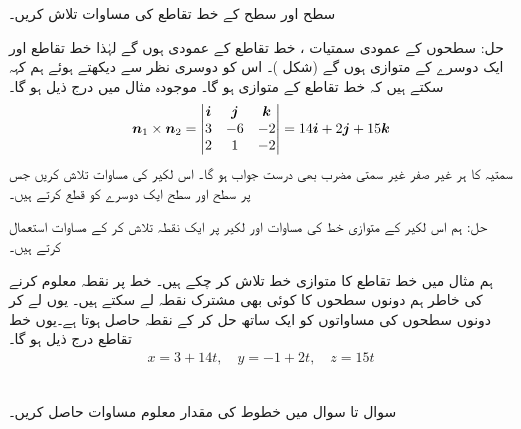 سطح  اور سطح  کے خط تقاطع کی مساوات تلاش کریں۔

حل:\quad
سطحوں کے عمودی سمتیات ،      خط تقاطع کے  عمودی ہوں  گے  لہٰذا خط تقاطع اور   ایک دوسرے کے  متوازی ہوں  گے (شکل )۔ اس کو دوسری نظر سے دیکھتے ہوئے ہم کہہ سکتے ہیں کہ   خط تقاطع کے متوازی ہو گا۔ موجودہ مثال میں درج ذیل ہو گا۔
\begin{align*}
{\ensuremath{{\boldsymbol{n}}}}_1\times{\ensuremath{{\boldsymbol{n}}}}_2=\begin{vmatrix}{\boldsymbol{i}}&{\boldsymbol{j}}&{\boldsymbol{k}}\\3&-6&-2\\2&1&-2\end{vmatrix}=14{\boldsymbol{i}}+2{\boldsymbol{j}}+15{\boldsymbol{k}}
\end{align*}
سمتیہ  کا ہر غیر صفر غیر سمتی مضرب بھی درست جواب ہو گا۔
اس لکیر کی مساوات تلاش کریں جس پر سطح  اور سطح  ایک دوسرے کو قطع کرتے ہیں۔

حل:\quad
ہم اس لکیر کے متوازی خط کی مساوات اور  لکیر پر ایک نقطہ  تلاش کر کے   مساوات  استعمال کرتے ہیں۔

ہم مثال  میں  خط  تقاطع کا متوازی خط   تلاش کر چکے ہیں۔ خط پر نقطہ معلوم کرنے کی خاطر  ہم دونوں سطحوں کا  کوئی بھی مشترک نقطہ لے سکتے ہیں۔ یوں  لے کر دونوں سطحوں کی مساواتوں کو ایک ساتھ حل کر کے نقطہ  حاصل ہوتا ہے۔یوں خط تقاطع درج ذیل ہو گا۔
\begin{align*}
x=3+14t,\quad y=-1+2t,\quad z=15t
\end{align*}


\\
سوال  تا  سوال    میں خطوط کی مقدار معلوم مساوات حاصل کریں۔

